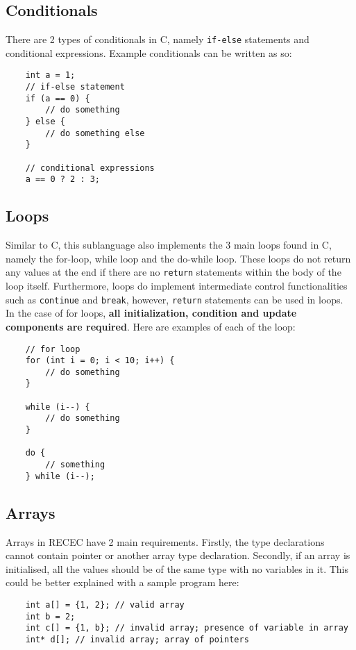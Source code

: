 \documentclass[a4paper]{article}
\begin{document}
\subsection{Conditionals}

There are 2 types of conditionals in C, namely \texttt{if-else} statements and conditional expressions. Example conditionals can be written as so:

\begin{verbatim}
	int a = 1;
	// if-else statement
	if (a == 0) {
		// do something
	} else {
		// do something else
	}

	// conditional expressions
	a == 0 ? 2 : 3;
\end{verbatim}

\subsection{Loops}

Similar to C, this sublanguage also implements the 3 main loops found in C, namely the for-loop, while loop and the do-while loop. These loops do not return any values at the end if there are no \texttt{return} statements within the body of the loop itself. Furthermore, loops do implement intermediate control functionalities such as \texttt{continue} and \texttt{break}, however, \texttt{return} statements can be used in loops. \\

In the case of for loops, \textbf{all initialization, condition and update components are required}. Here are examples of each of the loop:

\begin{verbatim}
	// for loop
	for (int i = 0; i < 10; i++) {
		// do something
	}

	while (i--) {
		// do something
	}

	do {
		// something
	} while (i--);
\end{verbatim}

\subsection{Arrays}
Arrays in RECEC have 2 main requirements. Firstly, the type declarations cannot contain pointer or another array type declaration. Secondly, if an array is initialised, all the values should be of the same type with no variables in it. This could be better explained with a sample program here:

\begin{verbatim}
	int a[] = {1, 2}; // valid array
	int b = 2;
	int c[] = {1, b}; // invalid array; presence of variable in array
	int* d[]; // invalid array; array of pointers
\end{verbatim}
\end{document}
